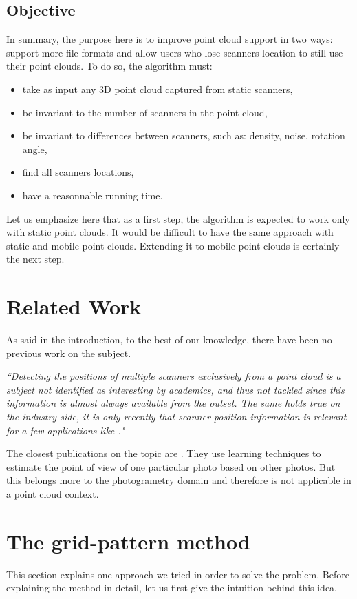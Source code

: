 \subsection{Objective}
In summary, the purpose here is to improve \CC point cloud support in two ways: support more file formats and allow users who lose scanners location to still use their point clouds. To do so, the algorithm must:
\begin{itemize}
  \item take as input any 3D point cloud captured from static scanners,
  \item be invariant to the number of scanners in the point cloud,
  \item be invariant to differences between scanners, such as: density, noise, rotation angle,
  \item find all scanners locations,
  \item have a reasonnable running time.
\end{itemize}

Let us emphasize here that as a first step, the algorithm is expected to work only with static point clouds. It would be difficult to have the same approach with static and mobile point clouds. Extending it to mobile point clouds is certainly the next step.

\section{Related Work}
\label{sc:work}
As said in the introduction, to the best of our knowledge, there have been no previous work on the subject.

\emph{``Detecting the positions of multiple scanners exclusively from a point cloud is a subject not identified as interesting by academics, and thus not tackled since this information is almost always available from the outset. The same holds true on the industry side, it is only recently that scanner position information is relevant for a few applications like \CC."}

The closest publications on the topic are \cite{ml1, ml2, ml3, ml4, ml5}. They use learning techniques to estimate the point of view of one particular photo based on other photos. But this belongs more to the photogrametry domain and therefore is not applicable in a point cloud context.


\section{The grid-pattern method}
\label{sc:grid-pattern}
This section explains one approach we tried in order to solve the problem. Before explaining the method in detail, let us first give the intuition behind this idea.

